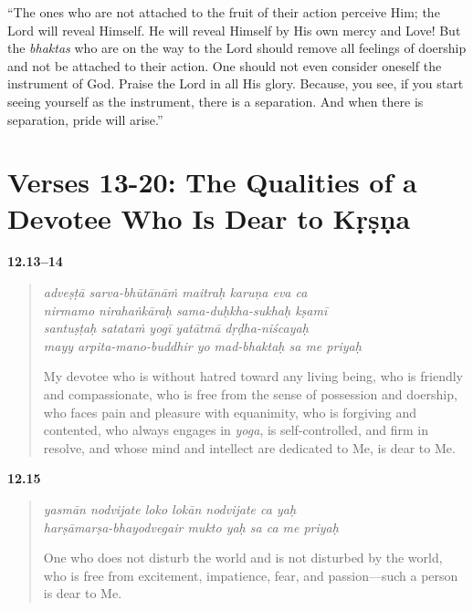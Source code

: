 \enquote{The ones who are not attached to the fruit of their action perceive Him; the Lord will reveal Himself. He will reveal Himself by His own mercy and Love! But the \textit{bhaktas} who are on the way to the Lord should remove all feelings of doership and not be attached to their action. One should not even consider oneself the instrument of God. Praise the Lord in all His glory. Because, you see, if you start seeing yourself as the instrument, there is a separation. And when there is separation, pride will arise.}


\section{Verses 13-20: The Qualities of a Devotee Who Is Dear to Kṛṣṇa}\label{sec-verses-13-20-the-qualities-of-a-devotee-who-is-dear-to-krsna}


\par\noindent\textbf{12.13–14}\par
\begin{verse}
\textit{adveṣṭā sarva-bhūtānāṁ maitraḥ karuṇa eva ca} \\
\textit{nirmamo nirahaṅkāraḥ sama-duḥkha-sukhaḥ kṣamī} \\
\textit{santuṣṭaḥ satataṁ yogī yatātmā dṛḍha-niścayaḥ} \\
\textit{mayy arpita-mano-buddhir yo mad-bhaktaḥ sa me priyaḥ}

\noindent My devotee who is without hatred toward any living being, who is friendly and compassionate, who is free from the sense of possession and doership, who faces pain and pleasure with equanimity, who is forgiving and contented, who always engages in \textit{yoga}, is self-controlled, and firm in resolve, and whose mind and intellect are dedicated to Me, is dear to Me.
\end{verse}
\par



\par\noindent\textbf{12.15}\par
\begin{verse}
\textit{yasmān nodvijate loko lokān nodvijate ca yaḥ} \\
\textit{harṣāmarṣa-bhayodvegair mukto yaḥ sa ca me priyaḥ}

\noindent One who does not disturb the world and is not disturbed by the world, who is free from excitement, impatience, fear, and passion---such a person is dear to Me.
\end{verse}
\par



